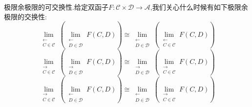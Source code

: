 极限余极限的可交换性.给定双函子$F:\mathscr{C}\times\mathscr{D}\to\mathscr{A}$,我们关心什么时候有如下极限余极限的交换性:
$$\lim\limits_{\substack{\leftarrow\\C\in\mathscr{C}}}\left(\lim\limits_{\substack{\leftarrow\\D\in\mathscr{D}}}F(C,D)\right)\cong\lim\limits_{\substack{\leftarrow\\D\in\mathscr{D}}}\left(\lim\limits_{\substack{\leftarrow\\C\in\mathscr{C}}}F(C,D)\right)$$
$$\lim\limits_{\substack{\rightarrow\\C\in\mathscr{C}}}\left(\lim\limits_{\substack{\rightarrow\\D\in\mathscr{D}}}F(C,D)\right)\cong\lim\limits_{\substack{\rightarrow\\D\in\mathscr{D}}}\left(\lim\limits_{\substack{\rightarrow\\C\in\mathscr{C}}}F(C,D)\right)$$
$$\lim\limits_{\substack{\rightarrow\\C\in\mathscr{C}}}\left(\lim\limits_{\substack{\leftarrow\\D\in\mathscr{D}}}F(C,D)\right)\cong\lim\limits_{\substack{\leftarrow\\D\in\mathscr{D}}}\left(\lim\limits_{\substack{\rightarrow\\C\in\mathscr{C}}}F(C,D)\right)$$
